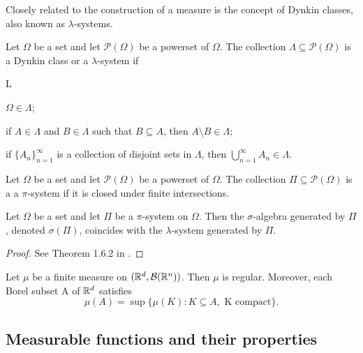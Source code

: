 Closely related to the construction of a measure is the concept of Dynkin classes, also known as $\lambda$-systems.
\begin{definition}
Let $\Omega$ be a set and let $\mathcal{P}(\Omega)$ be a powerset of $\Omega$. The collection $\Lambda \subseteq \mathcal{P}(\Omega)$ is a Dynkin class or a $\lambda$-system if
\begin{axioms}{L}
  \item \label{defn:measure:lambda:L1}  $\Omega \in \Lambda$;
  \item \label{defn:measure:lambda:L2}  if $A \in \Lambda$ and $B \in \Lambda$ such that $B \subseteq A$, then $A \setminus B \in \Lambda$;
  \item \label{defn:measure:lambda:L3}  if $\{ A_n \}_{n=1}^\infty$ is a collection of disjoint sets in $\Lambda$, then $\bigcup_{n=1}^\infty A_n \in \Lambda$.
\end{axioms}
\end{definition}
\begin{definition}[$\pi$-system]
Let $\Omega$ be a set and let $\mathcal{P}(\Omega)$ be a powerset of $\Omega$. The collection $\Pi \subseteq \mathcal{P}(\Omega)$ is a  a $\pi$-system if it is closed under finite intersections.
\end{definition}

\begin{theorem}
\label{thm:measure:lambda-pi}
Let $\Omega$ be a set and let $\Pi$ be a $\pi$-system on $\Omega$. Then the $\sigma$-algebra generated by $\Pi$, denoted $\sigma(\Pi)$, coincides with the $\lambda$-system generated by $\Pi$.
\end{theorem}
\begin{proof}
See Theorem 1.6.2 in \cite{cohn_2013_measure}.
\end{proof}

\begin{proposition}
\label{proposition:measure:regularity_borel_finite}
Let $\mu$ be a finite measure on $({\mathbb R}^d, {\mathcal B}({\mathbb R}^n))$. Then $\mu$ is regular. Moreover, each Borel subset A of ${\mathbb R}^d$ satisfies \[
\mu(A) = \sup \{ \mu (K) : K \subseteq A, \text{ K compact} \}.
\]
\end{proposition}

\subsection{Measurable functions and their properties}

